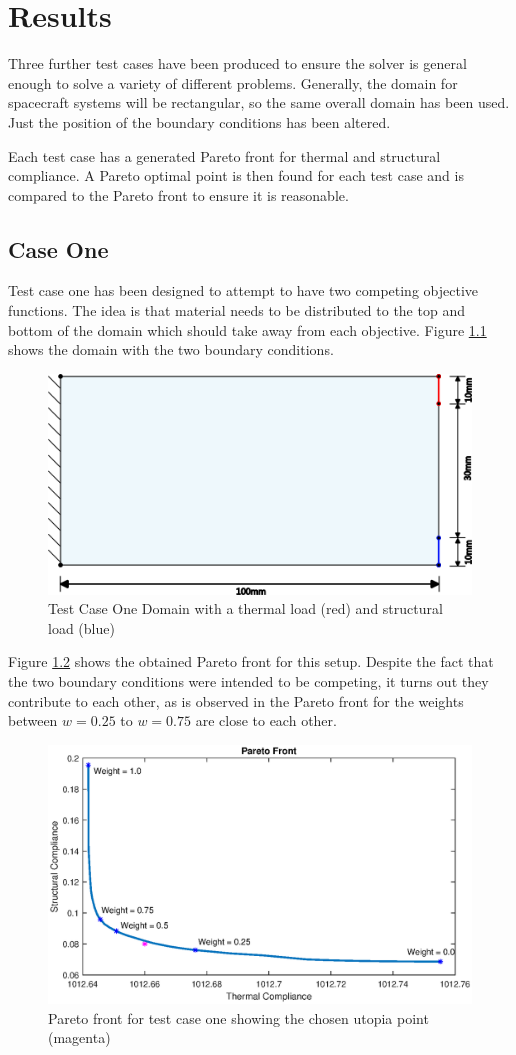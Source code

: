 \chapter{Results}
\label{chap:test_cases}
Three further test cases have been produced to ensure the solver is general enough to solve a variety of different problems. Generally, the domain for spacecraft systems will be rectangular, so the same overall domain has been used. Just the position of the boundary conditions has been altered.

Each test case has a generated Pareto front for thermal and structural compliance. A Pareto optimal point is then found for each test case and is compared to the Pareto front to ensure it is reasonable. 

\section{Case One}
Test case one has been designed to attempt to have two competing objective functions. The idea is that material needs to be distributed to the top and bottom of the domain which should take away from each objective. Figure \ref{fig:test_case_one_domain} shows the domain with the two boundary conditions.
\begin{figure}[ht]
    \centering
    \includegraphics[width=0.8\linewidth]{figures/chapter_6/Case1Domain.png}
    \caption{Test Case One Domain with a thermal load (red) and structural load (blue)}
    \label{fig:test_case_one_domain}
\end{figure}

Figure \ref{fig:test_case_one_pareto_front} shows the obtained Pareto front for this setup. Despite the fact that the two boundary conditions were intended to be competing, it turns out they contribute to each other, as is observed in the Pareto front for the weights between $w=0.25$ to $w=0.75$ are close to each other.
\begin{figure}[ht]
    \centering
    \includegraphics[width=0.6\linewidth]{figures/chapter_6/Case2_ParetoFront.eps} 
    \caption{Pareto front for test case one showing the chosen utopia point (magenta)}
    \label{fig:test_case_one_pareto_front}
\end{figure}

